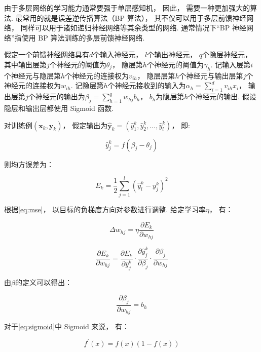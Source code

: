 由于多层网络的学习能力通常要强于单层感知机，
因此，
需要一种更加强大的算法.
最常用的就是误差逆传播算法（BP 算法），
其不仅可以用于多层前馈神经网络，
同样可以用于诸如递归神经网络等其余类型的网络.
通常情况下“BP 神经网络”指使用 BP 算法训练的多层前馈神经网络.

假定一个前馈神经网络具有$d$个输入神经元，
$l$个输出神经元，
$q$个隐层神经元，
其中输出层第$j$个神经元的阈值为$\theta_j$，
隐层第$h$个神经元的阈值为$\gamma_h$.
记输入层第$i$个神经元与隐层第$h$个神经元的连接权为$v_{ih}$，
隐层层第$h$个神经元与输出层第$j$个神经元的连接权为$w_{ih}$.
记隐层第$h$个神经元接收到的输入为$\alpha_h=\sum_{i=1}^dv_{ih}x_i$，
输出层第$j$个神经元的输出为$\beta_j=\sum_{h=1}^{q}{w_{hj}b_h}$，
$b_h$为隐层第$h$个神经元的输出.
假设隐层和输出层都使用 Sigmoid 函数.

对训练例$\left(\mathbf{x}_k, \mathbf{y}_k\right)$，
假定输出为$\hat{\mathbf{y}}_k=\left(\hat{y}_1^k, \hat{y}_2^k, \ldots, \hat{y}_l^k\right)$，
即:

\begin{equation}
    \label{eq:yjk}
    \hat{y}_j^k = f\left(\beta_j-\theta_j\right)
\end{equation}

则均方误差为：

\begin{equation}
    \label{eq:mse}
    E_k=\frac{1}{2}\sum_{j=1}^l{\left(\hat{y}_l^k-y_j^k\right)^2}
\end{equation}

根据\cref{eq:mse}，
以目标的负梯度方向对参数进行调整.
给定学习率$\eta$，
有：

\begin{equation}
    \Delta w_{hj}=\eta\frac{\partial{E_k}}{\partial{w_{hj}}}
\end{equation}

\begin{equation}
    \label{eq:partial}
    \frac{\partial{E_k}}{\partial{w_{hj}}}=\frac{\partial{E_k}}{\partial{\hat{y}_j^k}}\cdot\frac{\partial{\hat{y}_j^k}}{\partial{\beta_j}}\cdot\frac{\partial{\beta_j}}{\partial{w_{hj}}}
\end{equation}

由$\beta$的定义可以得出：

\begin{equation}
    \label{eq:b}
    \frac{\partial \beta_j}{\partial w_{hj}} = b_h
\end{equation}

对于\cref{eq:sigmoid}中 Sigmoid 来说，
有：

\begin{equation}
    f^{\prime}\left(x\right) = f\left(x\right)\left(1-f\left(x\right)\right)
\end{equation}

